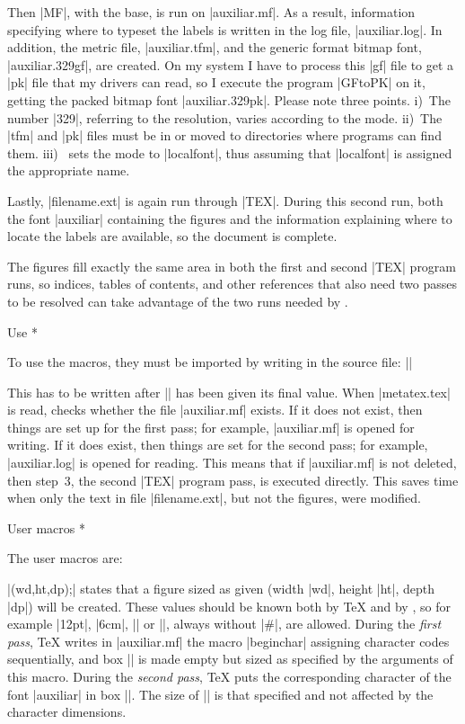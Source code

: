 \item Then |MF|, with the {\plain} base, is run on |auxiliar.mf|.
As a result, information specifying where to typeset the labels is
written in the log file, |auxiliar.log|.  In addition, the metric file,
|auxiliar.tfm|, and the generic format bitmap font, |auxiliar.329gf|,
are created.  On my system I have to process this |gf| file to get a
|pk| file that my drivers can read, so I execute the program |GFtoPK| on
it, getting the packed bitmap font |auxiliar.329pk|. Please note three
points.  i)~The number |329|, referring to the resolution, varies
according to the {\MF} mode.  ii)~The |tfm| and |pk| files must be in or
moved to directories where programs can find them. iii)~{\MTeX} sets the
{\MF} mode to |localfont|, thus assuming that |localfont| is assigned
the appropriate name.

\item Lastly, |filename.ext| is again run through |TEX|.  During this
second run, both the font |auxiliar| containing the figures and the
information explaining where to locate the labels are available, so the
document is complete.

\endlist

The figures fill exactly the same area in both the first and second
|TEX| program runs, so indices, tables of contents, and other references
that also need two passes to be resolved can take advantage of the two
runs needed by {\MTeX}.

\subhead * Use *

To use the {\MTeX} macros, they must be imported by writing in the
source file:  ||

\noindent This has to be written after |\mag| has been given its final
value. When |metatex.tex| is read, {\MTeX} checks whether the file
|auxiliar.mf| exists. If it does not exist, then things are set up for
the first pass; for example, |auxiliar.mf| is opened for writing.  If it
does exist, then things are set for the second pass; for example,
|auxiliar.log| is opened for reading.  This means that if
|auxiliar.mf| is not deleted, then step~3, the second |TEX| program
pass, is executed directly.  This saves time when only the text in file
|filename.ext|, but not the figures, were modified.

\subhead * User macros *

The {\MTeX} user macros are:

\list

\item |\MTbeginchar(wd,ht,dp);| states that a figure sized as given
(width |wd|, height |ht|, depth |dp|) will be created.  These values
should be known both by {\TeX} and by {\MF}, so for example |12pt|,
|6cm|, |\the\hsize| or |\the{}|, always without |#|, are allowed.
During the {\it first pass}, {\TeX} writes in |auxiliar.mf| the {\MF}
macro |beginchar| assigning character codes sequentially, and box
|\MTbox| is made empty but sized as specified by the arguments of this
macro. During the {\it second pass}, {\TeX} puts the corresponding
character of the font |auxiliar| in box |\MTbox|.  The size of |\MTbox| is
that specified and not affected by the character dimensions.

